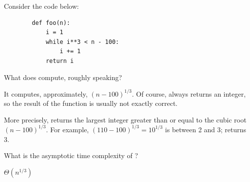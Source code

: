 \begin{prob}
    Consider the code below:

    \begin{verbatim}
        def foo(n):
            i = 1
            while i**3 < n - 100:
                i += 1
            return i
    \end{verbatim}

    \begin{subprobset}
        \begin{subprob}
            What does  compute, roughly speaking?

            \begin{soln}
                It computes, approximately, $(n - 100)^{1/3}$. Of course, 
                always returns an integer, so the result of the function is usually
                not exactly correct.

                More precisely,  returns the largest integer greater
                than or equal to the cubic root $(n - 100)^{1/3}$. For example, $(110 - 100)^{1/3} = 10^{1/3}$ is between 2 and 3;
                 returns 3.
            \end{soln}
        \end{subprob}

        \begin{subprob}
            What is the asymptotic time complexity of ?

            \begin{soln}
                $\Theta(n^{1/3})$

            \end{soln}
        \end{subprob}
    \end{subprobset}

\end{prob}
